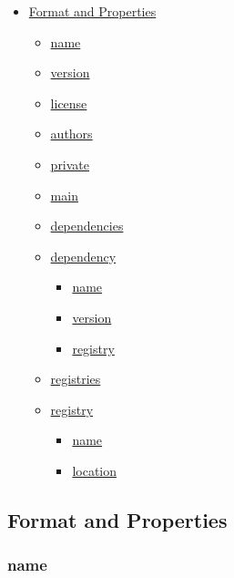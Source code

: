 \begin{itemize}
\tightlist
\item
  \protect\hyperlink{format-and-properties}{Format and Properties}

  \begin{itemize}
  \tightlist
  \item
    \protect\hyperlink{name}{name}
  \item
    \protect\hyperlink{version}{version}
  \item
    \protect\hyperlink{license}{license}
  \item
    \protect\hyperlink{authors}{authors}
  \item
    \protect\hyperlink{private}{private}
  \item
    \protect\hyperlink{main}{main}
  \item
    \protect\hyperlink{dependencies}{dependencies}
  \item
    \protect\hyperlink{dependency}{dependency}

    \begin{itemize}
    \tightlist
    \item
      \protect\hyperlink{name-1}{name}
    \item
      \protect\hyperlink{version-1}{version}
    \item
      \protect\hyperlink{registry}{registry}
    \end{itemize}
  \item
    \protect\hyperlink{registries}{registries}
  \item
    \protect\hyperlink{registry-1}{registry}

    \begin{itemize}
    \tightlist
    \item
      \protect\hyperlink{name-2}{name}
    \item
      \protect\hyperlink{location}{location}
    \end{itemize}
  \end{itemize}
\end{itemize}

\hypertarget{format-and-properties}{\subsection{Format and
Properties}\label{format-and-properties}}

\hypertarget{name}{\subsubsection{name}\label{name}}

